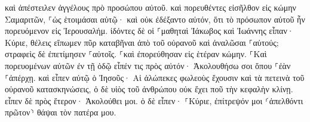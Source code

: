 \documentclass{openreader}
\begin{document}
καὶ ἀπέστειλεν ἀγγέλους πρὸ προσώπου αὐτοῦ. καὶ πορευθέντες εἰσῆλθον εἰς κώμην Σαμαριτῶν, ⸀ὡς ἑτοιμάσαι αὐτῷ· 
καὶ οὐκ ἐδέξαντο αὐτόν, ὅτι τὸ πρόσωπον αὐτοῦ ἦν πορευόμενον εἰς Ἰερουσαλήμ. 
ἰδόντες δὲ οἱ ⸀μαθηταὶ Ἰάκωβος καὶ Ἰωάννης εἶπαν· Κύριε, θέλεις εἴπωμεν πῦρ καταβῆναι ἀπὸ τοῦ οὐρανοῦ καὶ ἀναλῶσαι ⸀αὐτούς; 
στραφεὶς δὲ ἐπετίμησεν ⸀αὐτοῖς. 
⸀καὶ ἐπορεύθησαν εἰς ἑτέραν κώμην. 
⸀Καὶ πορευομένων αὐτῶν ἐν τῇ ὁδῷ εἶπέν τις πρὸς αὐτόν· Ἀκολουθήσω σοι ὅπου ⸀ἐὰν ⸀ἀπέρχῃ. 
καὶ εἶπεν αὐτῷ ὁ Ἰησοῦς· Αἱ ἀλώπεκες φωλεοὺς ἔχουσιν καὶ τὰ πετεινὰ τοῦ οὐρανοῦ κατασκηνώσεις, ὁ δὲ υἱὸς τοῦ ἀνθρώπου οὐκ ἔχει ποῦ τὴν κεφαλὴν κλίνῃ. 
εἶπεν δὲ πρὸς ἕτερον· Ἀκολούθει μοι. ὁ δὲ εἶπεν· ⸀Κύριε, ἐπίτρεψόν μοι ⸂ἀπελθόντι πρῶτον⸃ θάψαι τὸν πατέρα μου. 
\end{document}
